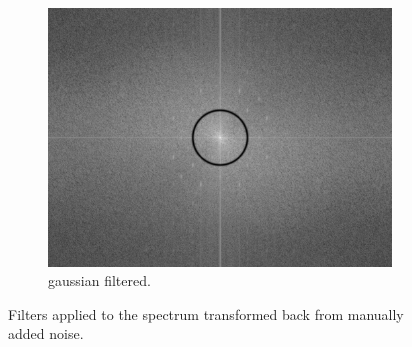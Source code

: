 \documentclass[14pt]{article}
\begin{document}
\begin{figure}[hbt!]
\begin{subfigure}[b]{0.3\linewidth}
					\includegraphics[width=\linewidth]{gaussian_filtered_spec.png}
					\caption{gaussian filtered.}
				\end{subfigure}
			\caption{Filters applied to the spectrum transformed back from manually added noise.}
			\label{fig:back}
			\end{figure}
		
\end{document}
